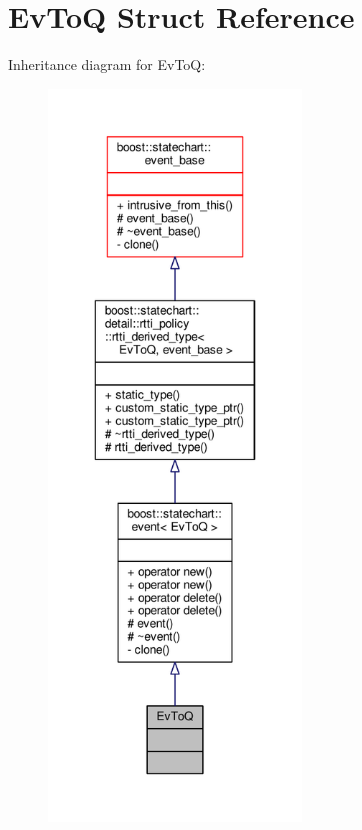 \hypertarget{struct_ev_to_q}{}\section{Ev\+ToQ Struct Reference}
\label{struct_ev_to_q}


Inheritance diagram for Ev\+ToQ\+:
\nopagebreak
\begin{figure}[H]
\begin{center}
\leavevmode
\includegraphics[height=550pt]{struct_ev_to_q__inherit__graph}
\end{center}
\end{figure}


